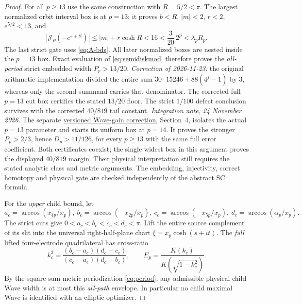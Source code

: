 \begin{proof}
For all $p\ge13$ use the
same construction with
$R=5/2<\pi$.
The largest normalized
orbit interval box is
at $p=13$; it proves
$b<R$, $|m|<2$, $r<2$,
$e^{5/2}<13$, and
\[
 |\mathcal{J}_P(-e^{s+it})|
 \le|m|+r\cosh R<16
 <\frac3{20}\,2^p
 <\lambda_pR_p.
\]
The last strict gate uses
\eqref{eq:A-bds}.
All later normalized boxes
are nested inside the $p=13$
box.  Exact evaluation of
\eqref{eq:semidiskmod}
therefore proves the
\emph{all-period} strict
embedded width $P_p>13/20$.
\emph{Correction of 2026-11-23:} the original arithmetic implementation
divided the entire sum $30\cdot15246+88(4^j-1)$ by $3$, whereas only
the second summand carries that denominator.  The corrected full
$p=13$ cut box certifies the stated $13/20$ floor.  The strict
$1/100$ defect conclusion survives with the corrected $40/819$
tail constant.
\emph{Integration note, 24 November 2026.}
The separate
\href{https://github.com/dovvnloading/loops-research-archive/blob/main/research/independent_audits/tip_family_wave_gain_correction_20261123/NOTE.md}{versioned Wave-gain correction},
Section~4, isolates the actual $p=13$ parameter and starts its uniform
box at $p=14$. It proves the stronger $P_p>2/3$, hence
$D_p>11/126$, for every $p\ge13$ with the same full error coefficient.
Both certificates coexist; the single widest box in this argument
proves the displayed $40/819$ margin. Their physical interpretation
still requires the stated analytic class and metric arguments.
The embedding, injectivity,
correct homotopy and
physical gate are checked
independently of the
abstract SC formula.

For the \emph{upper} child
bound, let
\[
 a_c=\arccos(x_{4p}/x_p),\
 b_c=\arccos(-x_{2p}/x_p),\
 c_c=\arccos(-x_{5p}/x_p),\
 d_c=\arccos(\alpha_p/x_p).
\]
The strict cuts give
$0<a_c<b_c<c_c<d_c<\pi$.
Lift the entire source
complement of its slit
into the universal
right-half-plane chart
$\xi=x_p\cosh(s+it)$.
The \emph{full} lifted
four-electrode quadrilateral
has cross-ratio
\begin{equation}\label{eq:child}
 k_c^2=
 \frac{(b_c-a_c)(d_c-c_c)}
 {(c_c-a_c)(d_c-b_c)},\qquad
 E_p=\frac{K(k_c)}{K(\sqrt{1-k_c^2})}.
\end{equation}
By the square-sum metric
periodization \eqref{eq:period},
any admissible physical
child Wave width is at most
this \emph{all-path}
envelope.  In particular
no child maximal Wave is
identified with an
elliptic optimizer.


\end{proof}
